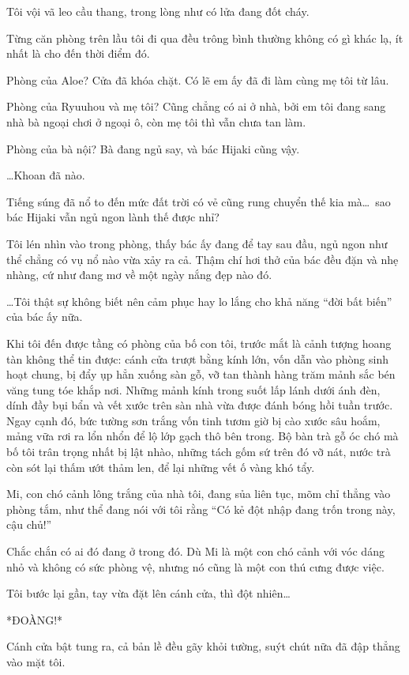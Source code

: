 \documentclass[../main.tex]{subfiles}
\begin{document}
\ct

Tôi vội vã leo cầu thang, trong lòng như có lửa đang đốt cháy.

Từng căn phòng trên lầu tôi đi qua đều trông bình thường không có gì khác lạ, ít nhất là cho đến thời điểm đó.

Phòng của Aloe? Cửa đã khóa chặt. Có lẽ em ấy đã đi làm cùng mẹ tôi từ lâu.

Phòng của Ryuuhou và mẹ tôi? Cũng chẳng có ai ở nhà, bởi em tôi đang sang nhà bà ngoại chơi ở ngoại ô, còn mẹ tôi thì vẫn chưa tan làm.

Phòng của bà nội? Bà đang ngủ say, và bác Hijaki cũng vậy.

\dots Khoan đã nào.

Tiếng súng đã nổ to đến mức đất trời có vẻ cũng rung chuyển thế kia mà\dots\ sao bác Hijaki vẫn ngủ ngon lành thế được nhỉ?

Tôi lén nhìn vào trong phòng, thấy bác ấy đang để tay sau đầu, ngủ ngon như thể chẳng có vụ nổ nào vừa xảy ra cả. Thậm chí hơi thở của bác đều đặn và nhẹ nhàng, cứ như đang mơ về một ngày nắng đẹp nào đó.

\dots Tôi thật sự không biết nên cảm phục hay lo lắng cho khả năng ``đời bất biến'' của bác ấy nữa.

Khi tôi đến được tầng có phòng của bố con tôi, trước mắt là cảnh tượng hoang tàn không thể tin được: cánh cửa trượt bằng kính lớn, vốn dẫn vào phòng sinh hoạt chung, bị đẩy ụp hẳn xuống sàn gỗ, vỡ tan thành hàng trăm mảnh sắc bén văng tung tóe khắp nơi. Những mảnh kính trong suốt lấp lánh dưới ánh đèn, dính đầy bụi bẩn và vết xước trên sàn nhà vừa được đánh bóng hồi tuần trước. Ngay cạnh đó, bức tường sơn trắng vốn tinh tươm giờ bị cào xước sâu hoắm, mảng vữa rơi ra lổn nhổn để lộ lớp gạch thô bên trong. Bộ bàn trà gỗ óc chó mà bố tôi trân trọng nhất bị lật nhào, những tách gốm sứ trên đó vỡ nát, nước trà còn sót lại thấm ướt thảm len, để lại những vết ố vàng khó tẩy.

Mi, con chó cảnh lông trắng của nhà tôi, đang sủa liên tục, mõm chỉ thẳng vào phòng tắm, như thể đang nói với tôi rằng ``Có kẻ đột nhập đang trốn trong này, cậu chủ!''

Chắc chắn có ai đó đang ở trong đó. Dù Mi là một con chó cảnh với vóc dáng nhỏ và không có sức phòng vệ, nhưng nó cũng là một con thú cưng được việc.

Tôi bước lại gần, tay vừa đặt lên cánh cửa, thì đột nhiên\dots

*ĐOÀNG!*

Cánh cửa bật tung ra, cả bản lề đều gãy khỏi tường, suýt chút nữa đã đập thẳng vào mặt tôi.
\end{document}
